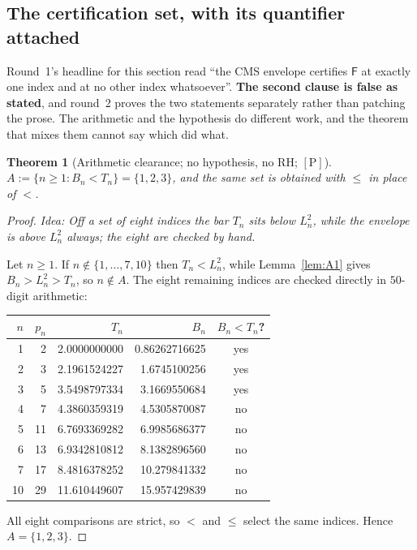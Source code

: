 \documentclass[11pt,a4paper]{article}
\theoremstyle{plain}
\newtheorem{theorem}{Theorem}[section]
\theoremstyle{definition}
\theoremstyle{remark}
\newcommand{\idea}[1]{\emph{Idea: #1}\par\smallskip}
\newcommand{\cP}{{[\mathrm{P}]}}
\newcommand{\Fb}{\mathsf{F}}
\begin{document}
\subsection{The certification set, with its quantifier attached}

Round~1's headline for this section read ``the CMS envelope certifies $\Fb$ at exactly one index
and at no other index whatsoever''. \textbf{The second clause is false as stated}, and round~2
proves the two statements separately rather than patching the prose. The arithmetic and the
hypothesis do different work, and the theorem that mixes them cannot say which did what.

\begin{theorem}[Arithmetic clearance; no hypothesis, no RH; $\cP$]
\label{thm:Azero}
$A := \{n \ge 1 : B_n < T_n\} = \{1,2,3\}$, and the same set is obtained with $\le$ in place of
$<$.
\end{theorem}

\begin{proof}
\idea{Off a set of eight indices the bar $T_n$ sits below $L_n^2$, while the envelope is above
$L_n^2$ always; the eight are checked by hand.}
Let $n \ge 1$. If $n \notin \{1,\dots,7,10\}$ then $T_n < L_n^2$, while Lemma~\ref{lem:A1}
gives $B_n > L_n^2 > T_n$, so $n \notin A$. The eight remaining indices are checked directly in
$50$-digit arithmetic:
\begin{center}
\begin{tabular}{rrrrc}
\toprule
$n$ & $p_n$ & $T_n$ & $B_n$ & $B_n < T_n$? \\
\midrule
1  & 2  & 2.0000000000 & 0.86262716625 & yes \\
2  & 3  & 2.1961524227 & 1.6745100256  & yes \\
3  & 5  & 3.5498797334 & 3.1669550684  & yes \\
4  & 7  & 4.3860359319 & 4.5305870087  & no \\
5  & 11 & 6.7693369282 & 6.9985686377  & no \\
6  & 13 & 6.9342810812 & 8.1382896560  & no \\
7  & 17 & 8.4816378252 & 10.279841332  & no \\
10 & 29 & 11.610449607 & 15.957429839  & no \\
\bottomrule
\end{tabular}
\end{center}
All eight comparisons are strict, so $<$ and $\le$ select the same indices. Hence
$A = \{1,2,3\}$.
\end{proof}
\end{document}
